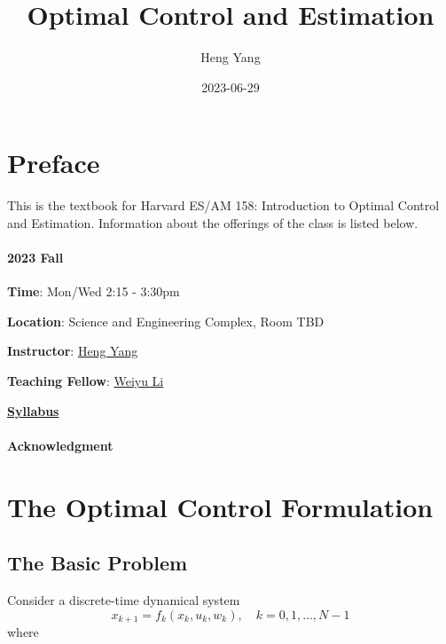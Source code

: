 \documentclass[
]{book}
\title{Optimal Control and Estimation}
\author{Heng Yang}
\date{2023-06-29}
\theoremstyle{definition}
\theoremstyle{definition}
\theoremstyle{definition}
\theoremstyle{definition}
\theoremstyle{remark}
\begin{document}
\maketitle

{
\setcounter{tocdepth}{1}
\tableofcontents
}
\hypertarget{preface}{%
\chapter*{Preface}\label{preface}}

This is the textbook for Harvard ES/AM 158: Introduction to Optimal Control and Estimation. Information about the offerings of the class is listed below.

\hypertarget{fall}{%
\subsubsection*{2023 Fall}\label{fall}}

\textbf{Time}: Mon/Wed 2:15 - 3:30pm

\textbf{Location}: Science and Engineering Complex, Room TBD

\textbf{Instructor}: \href{https://hankyang.seas.harvard.edu/}{Heng Yang}

\textbf{Teaching Fellow}: \href{https://scholar.harvard.edu/weiyuli/home}{Weiyu Li}

\href{https://docs.google.com/document/d/1q8_jB5dLx9jHOBi3DQ48Vv2E243ocGCGm_H0mJuOojM/edit?usp=sharing}{\textbf{Syllabus}}

\hypertarget{acknowledgment}{%
\subsubsection*{Acknowledgment}\label{acknowledgment}}

\hypertarget{formulation}{%
\chapter{The Optimal Control Formulation}\label{formulation}}

\hypertarget{the-basic-problem}{%
\section{The Basic Problem}\label{the-basic-problem}}

Consider a discrete-time dynamical system
\begin{equation}
x_{k+1} = f_k (x_k, u_k, w_k), \quad k =0,1,\dots,N-1
\label{eq:discrete-time-dynamics}
\end{equation}
where
\end{document}
